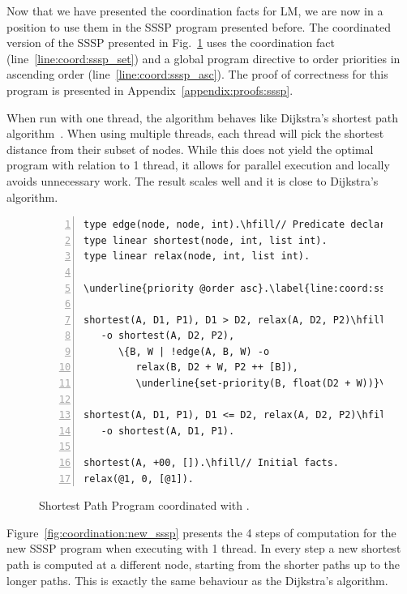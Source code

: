 Now that we have presented the coordination facts for LM, we are now in a
position to use them in the SSSP program presented before.  The coordinated
version of the SSSP presented in Fig.~\ref{code:shortest_path_program_coord}
uses the coordination fact  (line~\ref{line:coord:sssp_set})
and a global program directive to order priorities in ascending order
(line~\ref{line:coord:sssp_asc}). The proof of correctness for this program is
presented in Appendix~\ref{appendix:proofs:sssp}.

When run with one thread, the algorithm behaves like Dijkstra's shortest path
algorithm~\cite{Dijkstra}. When using multiple threads, each thread will pick
the shortest distance from their subset of nodes. While this does not yield the
optimal program with relation to 1 thread, it allows for parallel execution and
locally avoids unnecessary work. The result scales well and it is close to
Dijkstra's algorithm.

\begin{figure}[ht]
\begin{Verbatim}[numbers=left,commandchars=\\\{\},fontsize=\scriptsize]
type edge(node, node, int).\hfill// Predicate declaration.
type linear shortest(node, int, list int).
type linear relax(node, int, list int).

\underline{priority @order asc}.\label{line:coord:sssp_asc}

shortest(A, D1, P1), D1 > D2, relax(A, D2, P2)\hfill// Rule 1: newly improved path.
   -o shortest(A, D2, P2),
      \{B, W | !edge(A, B, W) -o
         relax(B, D2 + W, P2 ++ [B]),
         \underline{set-priority(B, float(D2 + W))}\}.\label{line:coord:sssp_set}

shortest(A, D1, P1), D1 <= D2, relax(A, D2, P2)\hfill// Rule 2: longer path.
   -o shortest(A, D1, P1).

shortest(A, +00, []).\hfill// Initial facts.
relax(@1, 0, [@1]).
\end{Verbatim}
   \caption{Shortest Path Program coordinated with .}
   \label{code:shortest_path_program_coord}
\end{figure}

Figure~\ref{fig:coordination:new_sssp} presents the 4 steps of computation for
the new SSSP program when executing with 1 thread. In every step a new shortest
path is computed at a different node, starting from the shorter paths up to
the longer paths. This is exactly the same behaviour as the Dijkstra's
algorithm.

